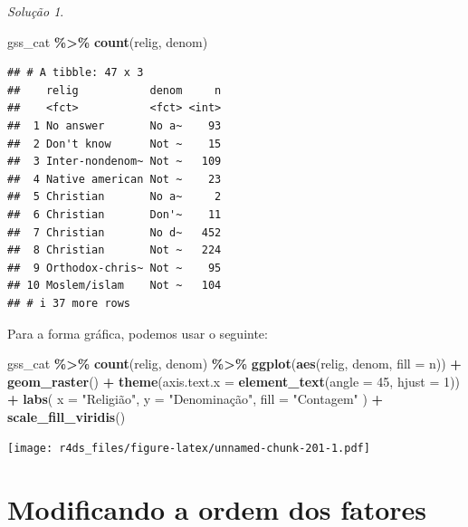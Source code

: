 \documentclass[
]{latex/krantz}
\newenvironment{Shaded}{\begin{snugshade}}{\end{snugshade}}
\newcommand{\AttributeTok}[1]{\textcolor[rgb]{0.13,0.29,0.53}{#1}}
\newcommand{\DecValTok}[1]{\textcolor[rgb]{0.00,0.00,0.81}{#1}}
\newcommand{\FunctionTok}[1]{\textcolor[rgb]{0.13,0.29,0.53}{\textbf{#1}}}
\newcommand{\NormalTok}[1]{#1}
\newcommand{\SpecialCharTok}[1]{\textcolor[rgb]{0.81,0.36,0.00}{\textbf{#1}}}
\newcommand{\StringTok}[1]{\textcolor[rgb]{0.31,0.60,0.02}{#1}}
\theoremstyle{definition}
\theoremstyle{definition}
\theoremstyle{definition}
\theoremstyle{definition}
\theoremstyle{remark}
\newtheorem*{solution}{Solução}
\begin{document}
\begin{solution}
\begin{Shaded}
\begin{Highlighting}[]
\NormalTok{gss\_cat }\SpecialCharTok{\%\textgreater{}\%}
  \FunctionTok{count}\NormalTok{(relig, denom)}
\end{Highlighting}
\end{Shaded}

\begin{verbatim}
## # A tibble: 47 x 3
##    relig           denom     n
##    <fct>           <fct> <int>
##  1 No answer       No a~    93
##  2 Don't know      Not ~    15
##  3 Inter-nondenom~ Not ~   109
##  4 Native american Not ~    23
##  5 Christian       No a~     2
##  6 Christian       Don'~    11
##  7 Christian       No d~   452
##  8 Christian       Not ~   224
##  9 Orthodox-chris~ Not ~    95
## 10 Moslem/islam    Not ~   104
## # i 37 more rows
\end{verbatim}

Para a forma gráfica, podemos usar o seguinte:

\begin{Shaded}
\begin{Highlighting}[]
\NormalTok{gss\_cat }\SpecialCharTok{\%\textgreater{}\%}
  \FunctionTok{count}\NormalTok{(relig, denom) }\SpecialCharTok{\%\textgreater{}\%}
  \FunctionTok{ggplot}\NormalTok{(}\FunctionTok{aes}\NormalTok{(relig, denom, }\AttributeTok{fill =}\NormalTok{ n)) }\SpecialCharTok{+}
    \FunctionTok{geom\_raster}\NormalTok{() }\SpecialCharTok{+}
    \FunctionTok{theme}\NormalTok{(}\AttributeTok{axis.text.x =} \FunctionTok{element\_text}\NormalTok{(}\AttributeTok{angle =} \DecValTok{45}\NormalTok{, }\AttributeTok{hjust =} \DecValTok{1}\NormalTok{)) }\SpecialCharTok{+}
    \FunctionTok{labs}\NormalTok{(}
      \AttributeTok{x =} \StringTok{"Religião"}\NormalTok{,}
      \AttributeTok{y =} \StringTok{"Denominação"}\NormalTok{,}
      \AttributeTok{fill =} \StringTok{"Contagem"}
\NormalTok{    ) }\SpecialCharTok{+}
    \FunctionTok{scale\_fill\_viridis}\NormalTok{()}
\end{Highlighting}
\end{Shaded}

\texttt{[image: r4ds\_files/figure-latex/unnamed-chunk-201-1.pdf]}
\end{solution}

\hypertarget{modificando-a-ordem-dos-fatores}{%
\section{Modificando a ordem dos fatores}\label{modificando-a-ordem-dos-fatores}}
\end{document}

